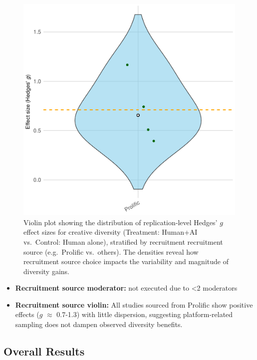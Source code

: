\documentclass[manuscript, screen, review, acmsmall, anonymous]{acmart}
\begin{document}
\begin{figure}[H]
  \centering
  \includegraphics[width=\linewidth]{plot_diversity_raw_violin_Recruitment_Source}
  \caption{Violin plot showing the distribution of replication‐level Hedges’ $g$ effect sizes for creative diversity (Treatment: Human+AI vs.\ Control: Human alone), stratified by recruitment recruitment source (e.g.\ Prolific vs.\ others). The densities reveal how recruitment source choice impacts the variability and magnitude of diversity gains.}
  \label{fig:diversity_raw_violin_platform}
\end{figure}
\begin{itemize}
  \item \textbf{Recruitment source moderator:} not executed due to <2 moderators
  \item \textbf{Recruitment source violin:} All studies sourced from Prolific show positive effects ($g$ $\approx$ 0.7-1.3) with little dispersion, suggesting platform‑related sampling does not dampen observed diversity benefits.
\end{itemize}
\newpage

\subsection{Overall Results}
\label{sec:CreativePerformanceComparisonOfHumanAndAI}
\end{document}
